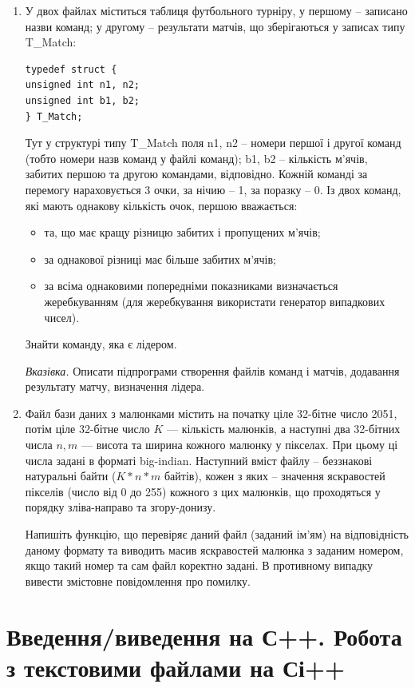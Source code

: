 \documentclass[a5paper,titlepage,openany,twoside,draft]{book_unv}%
\begin{document}
\begin{enumerate}
\def\labelenumi{\arabic{enumi})}
\setcounter{enumi}{11}
\item
  У двох файлах міститься таблиця футбольного турніру, у першому --
  записано назви команд; у другому -- результати матчів, що зберігаються
  у записах типу T\_Match:
\begin{verbatim}
typedef struct {
unsigned int n1, n2;
unsigned int b1, b2;
} T_Match;
\end{verbatim}
Тут у структурі типу T\_Match поля n1, n2 -- номери першої і другої 
команд (тобто номери назв команд у файлі команд); b1, b2 -- кількість
м'ячів, забитих першою та другою командами, відповідно.
Кожній команді за перемогу нараховується 3 очки, за нічию -- 1, за
поразку -- 0.
Із двох команд, які мають однакову кількість очок, першою вважається:
\begin{itemize}
\item
та, що має кращу різницю забитих і пропущених м'ячів;
\item
за однакової різниці має більше забитих м'ячів;
\item
за всіма однаковими попередніми показниками визначається жеребкуванням
(для жеребкування використати генератор випадкових чисел).
\end{itemize}
Знайти команду, яка є лідером.

\emph{Вказівка.} Описати підпрограми створення файлів команд і матчів, 
додавання результату матчу, визначення лідера.

\item
Файл бази даних з малюнками містить на початку ціле 32-бітне число
2051, потім ціле 32-бітне число $K$ --- кількість малюнків, а наступні два
32-бітних числа $n,m$ --- висота та ширина кожного малюнку у
пікселах. При цьому ці числа задані в форматі big-indian.
Наступний вміст файлу -- беззнакові натуральні байти ($K*n*m$ байтів),
кожен з яких -- значення яскравостей пікселів (число від 0 до 255)
кожного з цих малюнків, що проходяться у порядку зліва-направо та
згору-донизу.

Напишіть функцію, що перевіряє даний файл (заданий ім'ям) на
відповідність даному формату та виводить масив яскравостей малюнка з
заданим номером, якщо такий номер та сам файл коректно задані. В
противному випадку вивести змістовне повідомлення про помилку.

\end{enumerate}


\chapter{Введення/виведення на С++. Робота з текстовими файлами на Сі++}
%
\end{document}
